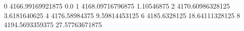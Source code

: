 0 4166.99169921875 0.0
1 4168.09716796875 1.10546875
2 4170.60986328125 3.6181640625
4 4176.58984375 9.59814453125
6 4185.6328125 18.64111328125
8 4194.5693359375 27.57763671875
